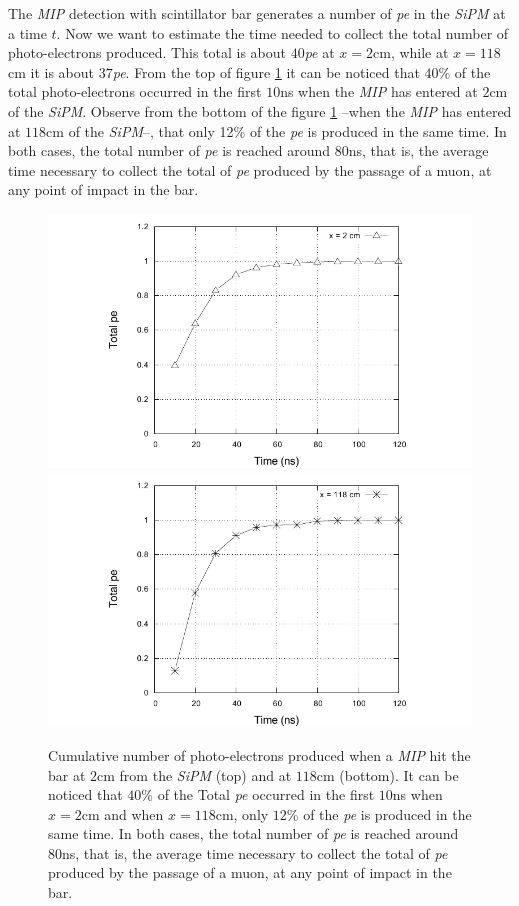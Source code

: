 \documentclass[submitting]{nst}
\begin{document}
The \textsl{MIP} detection with scintillator bar generates a number of \textsl{pe} in the \textsl{SiPM} at a time $t$. Now we want to estimate the time needed to collect the total number of photo-electrons produced. This total is about $40$\textsl{pe} at $x=2$cm, while at $x=118$cm it is about $37$\textsl{pe}. From the top of  figure \ref{cumulative} it can be noticed that $40$\% of the total photo-electrons occurred in the first $10$ns when the \textsl{MIP} has entered at $2$cm of the \textsl{SiPM}. Observe from the bottom of the figure \ref{cumulative} --when the \textsl{MIP} has entered at $118$cm of the \textsl{SiPM}--, that only 12\% of the \textsl{pe} is produced in the same time. In both cases, the total number of \textsl{pe} is reached around $80$ns, that is, the average time necessary to collect the total of \textsl{pe} produced by the passage of a muon, at any point of impact in the bar.
\begin{figure}
    \centering
    \includegraphics[scale=0.8]{Figures/cumulativo_1.pdf}
    \includegraphics[scale=0.8]{Figures/cumulativo_2.pdf}
    \caption{Cumulative number of photo-electrons produced when a \textsl{MIP} hit the bar at $2$cm from the  \textsl{SiPM} (top) and at $118$cm (bottom). It can be noticed that $40$\% of the Total \textsl{pe} occurred in the first $10$ns when $x=2$cm and when $x=118$cm, only $12$\% of the \textsl{pe} is produced in the same time. In both cases, the total number of \textsl{pe} is reached around $80$ns, that is, the average time necessary to collect the total of \textsl{pe} produced by the passage of a muon, at any point of impact in the bar.}
    \label{cumulative}
\end{figure}
\end{document}
